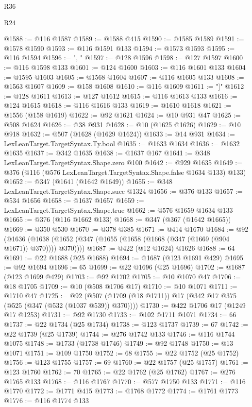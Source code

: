 \begin{lexlean}{R36}
\begin{lexlean}{R24}
\begin{coremodule}
{{{{{{{{{{{{{{{{{{{{{{{{{{{{{{{{{{{{{{{{{{{{{{{{{{{{{{{{{{{{{{{{{{{{{{{{{{{{{{{{{{{{{{{{{{{{{{{{{{{{{{{{{{{{{{{{{{{{{{{{{{{{{{{{{{{{{{{{{{{{{{{{{{{{{{{{{{{{{{{{{{{{{{{{{{{{{{{{{{{{{{{{{{{{{{{{{{{@1588 := @116 @1587
@1589 := @1588 @415
@1590 := @1585 @1589
@1591 := @1578 @1590
@1593 := @116 @1591 @133
@1594 := @1573 @1593
@1595 := @116 @1594
@1596 := ", "
@1597 := @128 @1596
@1598 := @127 @1597
@1600 := @116 @1598 @133
@1601 := @124 @1600
@1603 := @116 @1601 @133
@1604 := @1595 @1603
@1605 := @1568 @1604
@1607 := @116 @1605 @133
@1608 := @1563 @1607
@1609 := @158 @1608
@1610 := @116 @1609
@1611 := "]"
@1612 := @128 @1611
@1613 := @127 @1612
@1615 := @116 @1613 @133
@1616 := @124 @1615
@1618 := @116 @1616 @133
@1619 := @1610 @1618
@1621 := @1556 (@158 @1619)
@1622 := @92 @1621
@1624 := @10 @931 @47
@1625 := @508 @1624
@1626 := @38 @931
@1628 := @10 (@1625 @1626)
@1629 := @10 @918
@1632 := @507 (@1628 (@1629 @1624))
@1633 := @14 @931
@1634 := LexLeanTarget.TargetSyntax.Ty.bool
@1635 := @1633 @1634
@1636 := @1632 @1635
@1637 := @342 @1635
@1638 := @1637 @167
@1641 := @348 LexLeanTarget.TargetSyntax.Shape.zero @100
@1642 := @929 @1635
@1649 := @376 (@116 (@576 LexLeanTarget.TargetSyntax.Shape.false @1634 @133) @133)
@1652 := @347 (@1641 (@1642 @1649))
@1655 := @348 LexLeanTarget.TargetSyntax.Shape.succ @1324
@1656 := @376 @133
@1657 := @534 @1656
@1658 := @1637 @1657
@1659 := LexLeanTarget.TargetSyntax.Shape.true
@1662 := @576 @1659 @1634 @133
@1665 := @376 (@116 @1662 @133)
@1668 := @347 (@367 (@1642 @1665))
@1669 := @350 @530
@1670 := @378 @385
@1671 := @414 @1670
@1684 := @92
    (@1636 (@1638 (@1652 (@347 (@1655 (@1658 (@1668 (@347 (@1669 (@904 @1671)) @370)))) @370))))
@1687 := @422 (@12 @1624) @1626
@1688 := 64
@1691 := @22 @1688 (@25 @1688)
@1694 := @1687 (@123 @1691 @429)
@1695 := @92 @1694
@1696 := 65
@1699 := @22 @1696 (@25 @1696)
@1702 := @1687 (@123 @1699 @429)
@1703 := @92 @1702
@1705 := @10 @1070 @47
@1706 := @18 @1705
@1709 := @10 (@508 @1706 @17)
@1710 := @10 @1071
@1711 := @1710 @47
@1725 := @92 (@507 (@1709 (@18 @1711)) @17 (@342 @17 @375 (@525 (@347 (@532 (@1037 @539)) @370))))
@1730 := @422 @1706 @17 (@1249 @17 @1253)
@1731 := @92 @1730
@1733 := @102 @1711 @1071
@1734 := 66
@1737 := @22 @1734 (@25 @1734)
@1738 := @123 @1737
@1739 := 67
@1742 := @22 @1739 (@25 @1739)
@1744 := @276 @1742 @133
@1746 := @116 @1744 @1075
@1748 := @1733 (@1738 @1746)
@1749 := @92 @1748
@1750 := @13 @1071
@1751 := @109 @1750
@1752 := 68
@1755 := @22 @1752 (@25 @1752)
@1756 := @123 @1755
@1757 := 69
@1760 := @22 @1757 (@25 @1757)
@1761 := @123 @1760
@1762 := 70
@1765 := @22 @1762 (@25 @1762)
@1767 := @276 @1765 @133
@1768 := @116 @1767
@1770 := @577 @1750 @133
@1771 := @116 @1770
@1772 := @1771 @415
@1773 := @1768 @1772
@1774 := @1761 @1773
@1776 := @116 @1774 @133
}}}}}}}}}}}}}}}}}}}}}}}}}}}}}}}}}}}}}}}}}}}}}}}}}}}}}}}}}}}}}}}}}}}}}}}}}}}}}}}}}}}}}}}}}}}}}}}}}}}}}}}}}}}}}}}}}}}}}}}}}}}}}}}}}}}}}}}}}}}}}}}}}}}}}}}}}}}}}}}}}}}}}}}}}}}}}}}}}}}}}}}}}}}}}}}}}}}
\end{coremodule}
\end{lexlean}
\end{lexlean}
